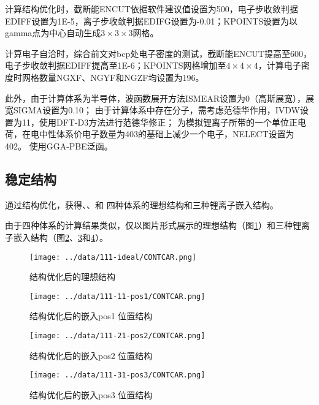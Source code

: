 计算结构优化时，截断能ENCUT依据软件建议值设置为500，电子步收敛判据EDIFF设置为1E-5，离子步收敛判据EDIFG设置为-0.01；KPOINTS设置为以gamma点为中心自动生成$3\times3\times3$网格。

计算电子自洽时，综合前文对bcp处电子密度的测试，截断能ENCUT提高至600，电子步收敛判据EDIFF提高至1E-6；KPOINTS网格增加至$4\times4\times4$，计算电子密度时网格数量NGXF、NGYF和NGZF均设置为196。

此外，由于计算体系为半导体，波函数展开方法ISMEAR设置为0（高斯展宽），展宽SIGMA设置为0.10；
由于计算体系中存在分子，需考虑范德华作用，IVDW设置为11，使用DFT-D3方法进行范德华修正；
为模拟锂离子所带的一个单位正电荷，在电中性体系价电子数量为403的基础上减少一个电子，NELECT设置为402。
使用GGA-PBE泛函。

\subsection{稳定结构}

通过结构优化，获得、、和 四种体系的理想结构和三种锂离子嵌入结构。

由于四种体系的计算结果类似，仅以图片形式展示的理想结构（图\ref{fig:111-ideal-contcar}）和三种锂离子嵌入结构（图\ref{fig:111-11-pos1-contcar}、\ref{fig:111-21-pos2-contcar}和\ref{fig:111-31-pos3-contcar}）。

\begin{figure}[ht]
    \centering
    \texttt{[image: ../data/111-ideal/CONTCAR.png]}
    \caption{结构优化后的理想结构}
    \label{fig:111-ideal-contcar}
\end{figure}
\begin{figure}[ht]
    \centering
    \texttt{[image: ../data/111-11-pos1/CONTCAR.png]}
    \caption{结构优化后的嵌入pos1 位置结构}
    \label{fig:111-11-pos1-contcar}
\end{figure}
\begin{figure}[ht]
    \centering
    \texttt{[image: ../data/111-21-pos2/CONTCAR.png]}
    \caption{结构优化后的嵌入pos2 位置结构}
    \label{fig:111-21-pos2-contcar}
\end{figure}
\begin{figure}[ht]
    \centering
    \texttt{[image: ../data/111-31-pos3/CONTCAR.png]}
    \caption{结构优化后的嵌入pos3 位置结构}
    \label{fig:111-31-pos3-contcar}
\end{figure}

